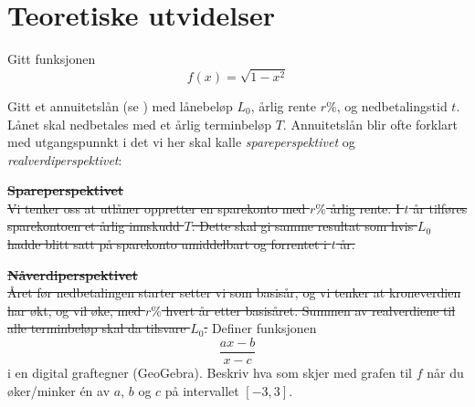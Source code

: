 \newpage
\section{Teoretiske utvidelser}
Gitt funksjonen
\[ f(x)=\sqrt{1-x^2} \]
\newpage

Gitt et annuitetslån (se \am)  med lånebeløp $ L_0 $, årlig rente $ r\% $, og nedbetalingstid $ t $. Lånet skal nedbetales med et årlig terminbeløp $ T $. 
Annuitetslån blir ofte forklart med utgangspunnkt i det vi her skal kalle \textit{spareperspektivet} og \textit{realverdiperspektivet}: \os

\st{
	\textbf{Spareperspektivet}\\
	Vi tenker oss at utlåner oppretter en sparekonto med $ r\% $ årlig rente. I $ t $ år tilføres sparekontoen et årlig innskudd $ T $. Dette skal gi samme resultat som hvis $ L_0 $ hadde blitt satt på sparekonto umiddelbart og forrentet i $ t $ år.
} 

\st{
	\textbf{Nåverdiperspektivet} \\
	Året før nedbetalingen starter setter vi som basisår, og vi tenker at kroneverdien har økt, og vil øke, med $ r\% $ hvert år etter basisåret. Summen av realverdiene til alle terminbeløp skal da tilsvare $ L_0 $.
}
\newpage
{}
Definer funksjonen
\[ \frac{ax-b}{x-c} \]
i en digital graftegner (GeoGebra). Beskriv hva som skjer med grafen til $ f $ når du øker/minker én av $ a $, $ b $ og $ c $ på intervallet $ [-3, 3] $.

